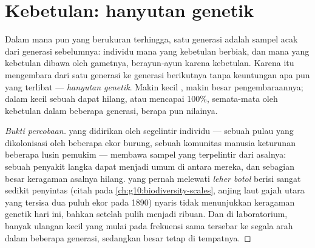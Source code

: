 \section{Kebetulan: hanyutan genetik}

\begin{proposition}\label{prop:g12:selection-drift-speciation:drift}
Dalam  mana pun yang berukuran terhingga,  satu generasi
adalah sampel acak dari generasi sebelumnya: individu mana yang
kebetulan berbiak, dan  mana yang kebetulan dibawa oleh gametnya,
berayun-ayun karena kebetulan. Karena itu  mengembara
dari satu generasi ke generasi berikutnya tanpa keuntungan apa pun
yang terlibat --- \emph{hanyutan genetik}.
Makin kecil , makin besar pengembaraannya; dalam 
kecil sebuah  dapat hilang, atau mencapai 100\%, semata-mata oleh
kebetulan dalam beberapa generasi, berapa pun nilainya.
\end{proposition}
\begin{proof}[Bukti percobaan]
 yang didirikan oleh segelintir individu --- sebuah pulau yang
dikolonisasi oleh beberapa ekor burung, sebuah komunitas manusia
keturunan beberapa lusin pemukim --- membawa sampel yang terpelintir
dari   asalnya: sebuah  penyakit langka dapat menjadi
umum di antara mereka, dan sebagian besar keragaman asalnya hilang.
 yang pernah melewati \emph{leher botol} berisi sangat sedikit
penyintas (citah pada \cref{ch:g10:biodiversity-scales}, anjing laut
gajah utara yang tersisa dua puluh ekor pada 1890) nyaris tidak
menunjukkan keragaman genetik hari ini, bahkan setelah pulih menjadi
ribuan. Dan di laboratorium, banyak  ulangan kecil yang mulai
pada frekuensi sama tersebar ke segala arah dalam beberapa generasi,
sedangkan  besar tetap di tempatnya.
\end{proof}

